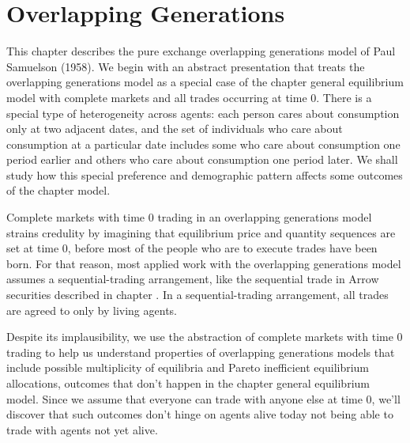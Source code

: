 

%




\def\toone{{t+1}}
\def\ttwo{{t+2}}
\def\tthree{{t+3}}
\def\Tone{{T+1}}
\def\TTT{{T-1}}
\def\rtr{{\rm tr}}
\def\tone{{t+1}}



\chapter{Overlapping Generations\label{ogmodels}}

This chapter describes the pure exchange overlapping generations
model of Paul Samuelson (1958).
 We begin with an
abstract presentation  that treats the overlapping
generations model as a special case of the chapter 
general equilibrium model with complete markets and all
trades occurring at time $0$.
There is a special  type of heterogeneity across
agents: each person 
cares about consumption only at  two adjacent dates, and the set of
individuals who care about consumption at a particular date
includes some who care about consumption one period earlier and others
who care about consumption one period later.   We shall study
how  this
special preference and demographic  pattern affects some
 outcomes of the chapter  model.

Complete markets with time $0$ trading in
an overlapping generations model strains
credulity by imagining  that equilibrium price and quantity sequences
are set at time $0$,
before most of the people who are to execute  trades have been born.
  For that reason, most applied work with the overlapping generations
model assumes a sequential-trading arrangement, like
the sequential trade in Arrow securities described   in chapter
.
In a  sequential-trading arrangement,  all trades are 
agreed to only by living agents.

Despite its implausibility, we use the abstraction of
complete markets with time 0 trading to help us  understand
properties of   overlapping generations models 
that include  possible  multiplicity of equilibria and Pareto inefficient
equilibrium allocations, outcomes that don't  happen in the 
chapter  general equilibrium model. Since we  assume that everyone can 
trade with anyone else at time 0, we'll discover that such  outcomes 
 don't  hinge on 
agents alive today not being able to trade with agents not yet alive.


